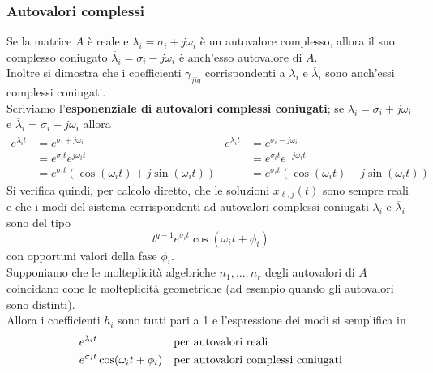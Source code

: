 \documentclass{article}
\begin{document}
\subsubsection{Autovalori complessi}
Se la matrice $A$ è reale e $\lambda_i = \sigma_i + j \omega_i$ è un autovalore complesso, allora il suo complesso coniugato $\overline{\lambda}_i = \sigma_i - j \omega_i$ è anch'esso autovalore di $A$.\\
Inoltre si dimostra che i coefficienti $\gamma_{jiq}$ corrispondenti a $\lambda_i$ e $\overline{\lambda}_i$ sono anch'essi complessi coniugati.\\
Scriviamo l'\textbf{esponenziale di autovalori complessi coniugati}; se $\lambda_i = \sigma_i + j \omega_i$ e $\overline{\lambda}_i = \sigma_i - j \omega_i$ allora
\begin{align*}
    e^{\lambda_i t} &= e^{\sigma_i + j \omega_i} & e^{\overline{\lambda}_i t} &= e^{\sigma_i - j \omega_i}\\
    &= e^{\sigma_i t} e^{j \omega_i t} & &= e^{\sigma_i t} e^{-j \omega_i t}\\
    &= e^{\sigma_i t} (\cos(\omega_i t) + j \sin(\omega_i t)) & &= e^{\sigma_i t} (\cos(\omega_i t) - j \sin(\omega_i t))
\end{align*}
Si verifica quindi, per calcolo diretto, che le soluzioni $x_{\ell,j}(t)$ sono sempre reali e che i modi del sistema corrispondenti ad autovalori complessi coniugati $\lambda_i$ e $\overline{\lambda}_i$ sono del tipo
\[
    t^{q-1} e^{\sigma_i t} \cos (\omega_i t + \phi_i)
\]
con opportuni valori della fase $\phi_i$.
\vspace*{0.2cm}\\
Supponiamo che le molteplicità algebriche $n_1,...,n_r$ degli autovalori di $A$ coincidano cone le molteplicità geometriche (ad esempio quando gli autovalori sono distinti).\\
Allora i coefficienti $h_i$ sono tutti pari a 1 e l'espressione dei modi si semplifica in 
\begin{align*}
    &e^{\lambda_i t} & &\text{per autovalori reali}\\
    &e^{\sigma _i t} \cos (\omega_i t + \phi_i) & &\text{per autovalori complessi coniugati}
\end{align*}
\end{document}
